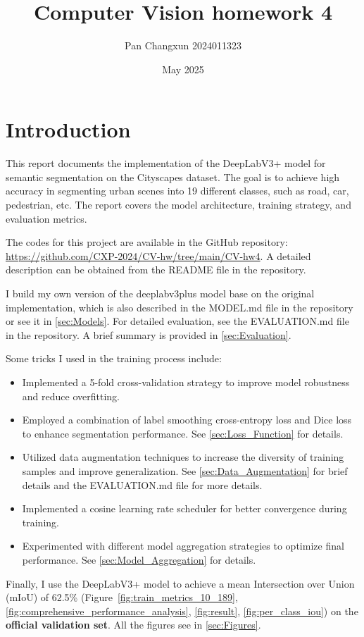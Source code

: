 \documentclass[]{article}
\title{\textbf{Computer Vision homework 4}}
\author{Pan Changxun 2024011323}
\date{May 2025}
\begin{document}
\maketitle

\section{Introduction}
This report documents the implementation of the DeepLabV3+ model for semantic segmentation on the Cityscapes dataset. The goal is to achieve high accuracy in segmenting urban scenes into 19 different classes, such as road, car, pedestrian, etc. The report covers the model architecture, training strategy, and evaluation metrics.

The codes for this project are available in the GitHub repository: \url{https://github.com/CXP-2024/CV-hw/tree/main/CV-hw4}.
A detailed description can be obtained from the README file in the repository. 

I build my own version of the deeplabv3plus model base on the original implementation, which is also described in the MODEL.md file in the repository or see it in \ref{sec:Models}. For detailed evaluation, see the EVALUATION.md file in the repository. A brief summary is provided in \ref{sec:Evaluation}.

Some tricks I used in the training process include:
\begin{itemize}
		\item Implemented a 5-fold cross-validation strategy to improve model robustness and reduce overfitting.
		\item Employed a combination of label smoothing cross-entropy loss and Dice loss to enhance segmentation performance. See \ref{sec:Loss_Function} for details.
		\item Utilized data augmentation techniques to increase the diversity of training samples and improve generalization. See \ref{sec:Data_Augmentation} for brief details and the EVALUATION.md file for more details.
		\item Implemented a cosine learning rate scheduler for better convergence during training. 
		\item Experimented with different model aggregation strategies to optimize final performance. See \ref{sec:Model_Aggregation} for details.
\end{itemize}

Finally, I use the DeepLabV3+ model to achieve a mean Intersection over Union (mIoU) of 62.5\% (Figure~\ref{fig:train_metrics_10_189}, \ref{fig:comprehensive_performance_analysis}, \ref{fig:result}, \ref{fig:per_class_iou}) on the \textbf{official validation set}. All the figures see in \ref{sec:Figures}.
\end{document}
